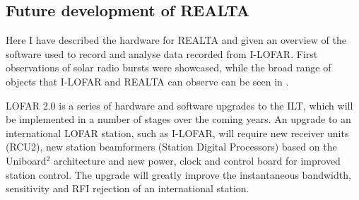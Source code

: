 \subsection{Future development of REALTA}
\label{sec:realta_future_work}

Here I have described the hardware for REALTA and given an overview of the software used to record and analyse data recorded from I-LOFAR. First observations of solar radio bursts were showcased, while the broad range of objects that I-LOFAR and REALTA can observe can be seen in \cite{Murphy2021b}. 

LOFAR 2.0 is a series of hardware and software upgrades to the ILT, which will be implemented in a number of stages over the coming years. An upgrade to an international LOFAR station, such as I-LOFAR, will require new receiver units (RCU2), new station beamformers (Station Digital Processors) based on the Uniboard$^2$ architecture \citep{Schoonderbeek2019} and new power, clock and control board for improved station control. The upgrade will greatly improve the instantaneous bandwidth, sensitivity and RFI rejection of an international station.



